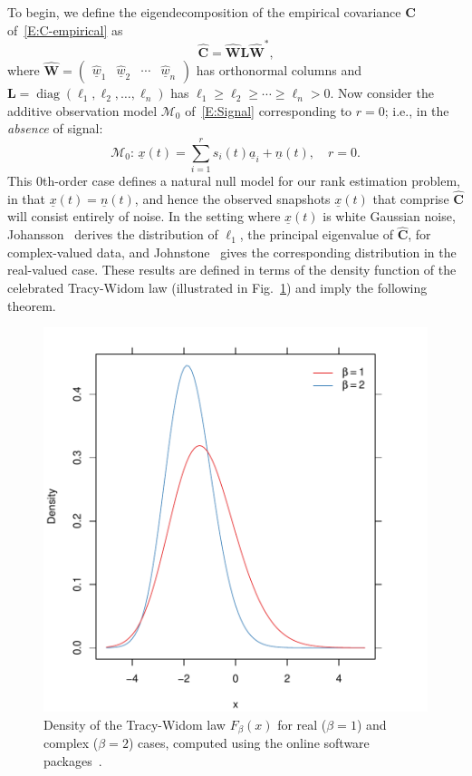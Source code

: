 \documentclass[final]{IEEEtran}
\newcommand{\vectorsymbol}{\underline}
\newcommand{\matrixsymbol}{\boldsymbol}
\newcommand{\mhC}{\widehat{\matrixsymbol{C}}}
\newcommand{\mhW}{\widehat{\matrixsymbol{W}}}
\newcommand{\mL}{\matrixsymbol{L}}
\newcommand{\va}{\vectorsymbol{a}}
\newcommand{\vn}{\vectorsymbol{n}}
\newcommand{\vhw}{\hat{\vectorsymbol{w}}}
\newcommand{\vx}{\vectorsymbol{x}}
\DeclareMathOperator*{\diag}{diag}
\begin{document}
To begin, we define the eigendecomposition of the empirical covariance $\mhC$ of~\eqref{E:C-empirical} as
\begin{equation}\label{E:Cemp-decomp-eig}
    \mhC = \mhW \mL \mhW^* \text{,}
\end{equation}
where
\(
    \mhW
    =
    \left(
    \begin{matrix}
        \vhw_1 & \vhw_2 & \cdots & \vhw_n
    \end{matrix}
    \right)
\)
has orthonormal columns and
\(
    \mL
    =
    \diag( \ell_1, \ell_2, \ldots, \ell_n )
\)
has $\ell_1 \geq \ell_2 \geq \cdots \geq \ell_{n} > 0$.  Now consider the additive observation model $\mathcal{M}_0$ of~\eqref{E:Signal} corresponding to $r=0$; i.e., in the \emph{absence} of signal:
\begin{equation*}
    \mathcal{M}_0\!:\, \vx(t) = \sum_{i=1}^{r} s_{i}(t) \va_{i} + \vn(t), \quad r = 0 .
\end{equation*}
This $0$th-order case defines a natural null model for our rank estimation problem, in that $\vx(t) = \vn(t)$, and hence the observed snapshots $\vx(t)$ that comprise $\mhC$ will consist entirely of noise.  In the setting where $\vx(t)$ is white Gaussian noise, Johansson~\cite{johansson2000sfa} derives the distribution of $\ell_1$, the principal eigenvalue of $\mhC$, for complex-valued data, and Johnstone~\cite{johnstone2001dle} gives the corresponding distribution in the real-valued case.  These results are defined in terms of the density function of the celebrated Tracy-Widom law (illustrated in Fig.~\ref{F:tw-density}) and imply the following theorem.
\begin{figure}[t]
    \centering
    \includegraphics[width=\columnwidth]{plots/tw-density}
    \caption{\label{F:tw-density}Density of the Tracy-Widom law $F_\beta(x)$ for real ($\beta=1$) and complex ($\beta=2$) cases, computed using the online software packages~\cite{dieng2006rml, perry2009rmtstat}.
    }
\end{figure}
\end{document}
